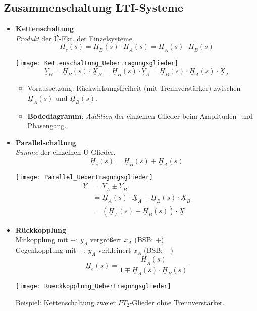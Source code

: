 \clearpage
\subsection{Zusammenschaltung LTI-Systeme}
\begin{itemize}
    \item \textbf{Kettenschaltung}\\
        \textit{Produkt} der Ü-Fkt. der Einzelsysteme.
        \[
            \boxed{\underline{H}_{e}(s)=\underline{H}_{B}(s) \cdot \underline{H}_{A}(s)=\underline{H}_{A}(s) \cdot \underline{H}_{B}(s)}
        \]
        \begin{center}
            \texttt{[image: Kettenschaltung\_Uebertragungsglieder]}
            \[
                \underline{Y}_{B}=\underline{H}_{B}(s) \cdot \underline{X}_{B}=\underline{H}_{B}(s) \cdot \underline{Y}_{A}=\underline{H}_{B}(s) \cdot \underline{H}_{A}(s) \cdot \underline{X}_{A}
            \]
        \end{center}
        \begin{itemize}
	        \item Voraussetzung: Rückwirkungsfreiheit (mit Trennverstärker) zwischen $\underline{H}_A(s)$ und $\underline{H}_B(s)$.
        	\item \textbf{Bodediagramm}: \textit{Addition} der einzelnen Glieder beim Amplituden- und Phasengang.
        \end{itemize}      
    \item \textbf{Parallelschaltung}\\
        \textit{Summe} der einzelnen Ü-Glieder.
        \[
            \boxed{\underline{H}_{e}(s)=\underline{H}_{B}(s) + \underline{H}_{A}(s)}
        \]
        \begin{center}
            \texttt{[image: Parallel\_Uebertragungsglieder]}
            \begin{align*}
                \underline{Y}&=\underline{Y}_{A} \pm \underline{Y}_{B}\\
                             &=\underline{H}_{A}(s) \cdot \underline{X}_{A} \pm \underline{H}_{B}(s) \cdot \underline{X}_{B}\\
                             &=\left(\underline{H}_{A}(s)+\underline{H}_{B}(s)\right) \cdot \underline{X}
            \end{align*}
        \end{center}
    \item \textbf{Rückkopplung}\\
    Mitkopplung mit $-$: $y_A$ vergrößert $x_A$ (BSB: $+$)\\
    Gegenkopplung mit $+$: $y_A$ verkleinert $x_A$ (BSB: $-$)
    \[
    \boxed{\underline{H}_{e}(s)=\frac{\underline{H}_{A}(s)}{1\mp\underline{H}_{A}(s) \cdot \underline{H}_{B}(s)}}
    \]
    \begin{center}
    	\texttt{[image: Rueckkopplung\_Uebertragungsglieder]}
    \end{center}
    Beispiel: Kettenschaltung zweier $PT_2$-Glieder ohne Trennverst\"arker.
    \end{itemize}
 
